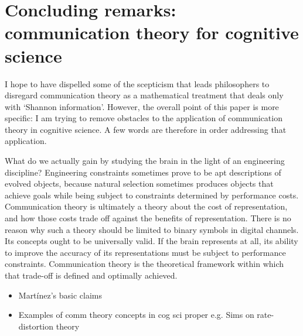 \section{\sloppy Concluding remarks: communication theory for cognitive science}\label{sec:conclusion}

I hope to have dispelled some of the scepticism that leads philosophers to disregard communication theory as a mathematical treatment that deals only with `Shannon information'.
However, the overall point of this paper is more specific: I am trying to remove obstacles to the application of communication theory in cognitive science.
A few words are therefore in order addressing that application.

What do we actually gain by studying the brain in the light of an engineering discipline?
Engineering constraints sometimes prove to be apt descriptions of evolved objects, because natural selection sometimes produces objects that achieve goals while being subject to constraints determined by performance costs.
Communication theory is ultimately a theory about the cost of representation, and how those costs trade off against the benefits of representation.
There is no reason why such a theory should be limited to binary symbols in digital channels.
Its concepts ought to be universally valid.
If the brain represents at all, its ability to improve the accuracy of its representations must be subject to performance constraints.
Communication theory is the theoretical framework within which that trade-off is defined and optimally achieved.

\begin{itemize}
    \item Mart\'{i}nez's basic claims
    \item Examples of comm theory concepts in cog sci proper e.g. Sims on rate-distortion theory
\end{itemize}